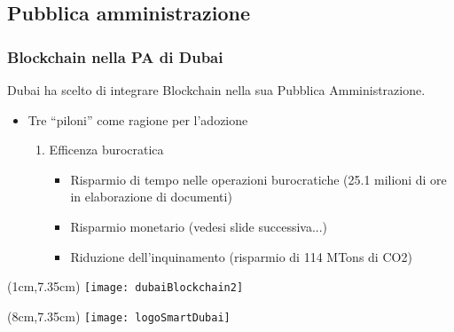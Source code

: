 \subsection{Pubblica amministrazione}
\begin{frame}
 \frametitle{Blockchain nella PA di Dubai}

 Dubai ha scelto di integrare Blockchain nella sua Pubblica Amministrazione.
 \begin{itemize}
  \item<1-> Tre ``piloni'' come ragione per l'adozione
  \begin{enumerate}
   \item<2-> Efficenza burocratica
   \begin{itemize}
   \item<3-> Risparmio di tempo nelle operazioni burocratiche (25.1 milioni di
ore in elaborazione di documenti)
   \item<4-> Risparmio monetario (vedesi slide successiva...)
   \item<5-> Riduzione dell'inquinamento (risparmio di 114 MTons di CO2)
  \end{itemize}
  \end{enumerate}

 \end{itemize}


 \begin{textblock*}{5cm}(1cm,7.35cm)
  \texttt{[image: dubaiBlockchain2]}
 \end{textblock*}

 \begin{textblock*}{5cm}(8cm,7.35cm)
  \texttt{[image: logoSmartDubai]}
 \end{textblock*}

\end{frame}

